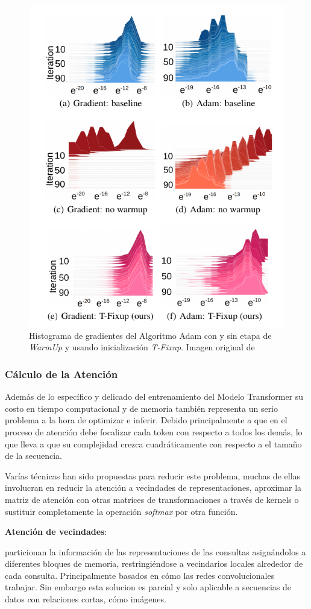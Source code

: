 \begin{figure}[ht!]
    \centering
    \includegraphics[width=0.5 \textwidth]{Chapters/1. Transformer/Figures/transformer/tfixup.png}
    \caption{Histograma de gradientes del Algoritmo Adam con y sin etapa de \textit{WarmUp} y
    usando inicialización \textit{T-Fixup}. Imagen original de \citeauthor*{pmlr-v119-huang20f}}
    \label{fig:t-fixup}
\end{figure}

\subsubsection{Cálculo de la Atención}

Además de lo específico y delicado del entrenamiento del Modelo Transformer su costo en tiempo
computacional y de memoria también representa un serio problema a la hora de optimizar e inferir.
Debido principalmente a que en el proceso de atención debe focalizar cada token con respecto a todos
los demás, lo que lleva a que su complejidad crezca cuadráticamente con respecto a el tamaño de la
secuencia.

Varías técnicas han sido propuestas para reducir este problema, muchas de ellas involucran en reducir
la atención a vecindades de representaciones, aproximar la matriz de atención con otras matrices de
transformaciones a través de kernels o sustituir completamente la operación \textit{softmax}
por otra función.

\textbf{Atención de vecindades}:

\citeauthor*{DBLP:journals/corr/abs-1802-05751} particionan la información de las representaciones de
las consultas asignándolos a diferentes bloques de memoria, restringiéndose a vecindarios locales
alrededor de cada consulta. Principalmente basados en cómo las redes convolucionales trabajar. Sin
embargo esta solucion es parcial y solo aplicable a secuencias de datos con relaciones cortas, cómo
imágenes.

